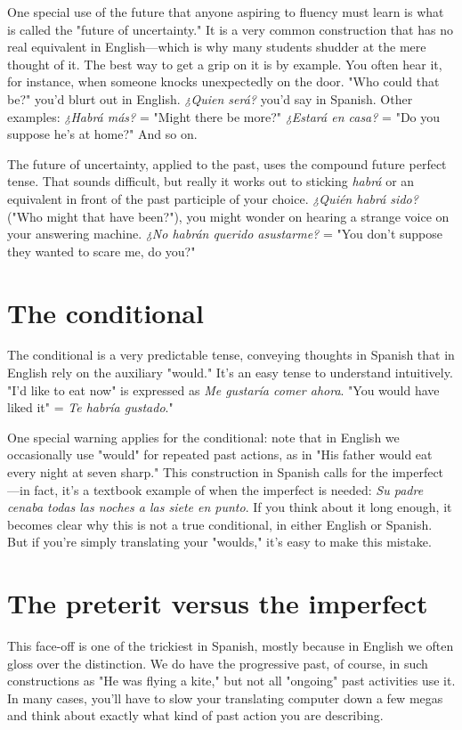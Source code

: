 \documentclass[14pt,a4paper,oneside]{memoir}
\begin{document}
One special use of the future that anyone aspiring to fluency
must learn is what is called the "future of uncertainty." It is a very
common construction that has no real equivalent in English---which is
why many students shudder at the mere thought of it. The best way to
get a grip on it is by example. You often hear it, for instance, when
someone knocks unexpectedly on the door. "Who could that be?"
you'd blurt out in English. \emph{¿Quien será?} you'd say in Spanish. Other
examples: \emph{¿Habrá más?} = "Might there be more?" \emph{¿Estará en casa?} =
"Do you suppose he's at home?" And so on.

The future of uncertainty, applied to the past, uses the compound future perfect tense. That sounds difficult, but really it works
out to sticking \emph{habrá} or an equivalent in front of the past participle of
your choice. \emph{¿Quién habrá sido?} ("Who might that have been?"), you
might wonder on hearing a strange voice on your answering machine.
\emph{¿No habrán querido asustarme?} = "You don't suppose they wanted to
scare me, do you?"

\section{The conditional}

The conditional is a very predictable tense, conveying
thoughts in Spanish that in English rely on the auxiliary "would." It's
an easy tense to understand intuitively. "I'd like to eat now" is expressed as \emph{Me gustaría comer ahora}. "You would have liked it" = \emph{Te habría gustado}."

One special warning applies for the conditional: note that in
English we occasionally use "would" for repeated past actions, as in
"His father would eat every night at seven sharp." This construction
in Spanish calls for the imperfect---in fact, it's a textbook example of
when the imperfect is needed: \emph{Su padre cenaba todas las noches a las
	siete en punto}. If you think about it long enough, it becomes clear why
this is not a true conditional, in either English or Spanish. But if you're
simply translating your "woulds," it's easy to make this mistake.

\section{The preterit versus the imperfect}

This face-off is one of the trickiest in Spanish, mostly because
in English we often gloss over the distinction. We do have the progressive past, of course, in such constructions as "He was flying a kite,"
but not all "ongoing" past activities use it. In many cases, you'll have
to slow your translating computer down a few megas and think about
exactly what kind of past action you are describing.
\end{document}
